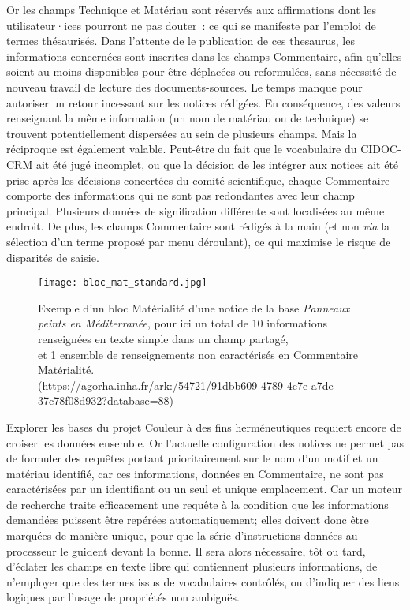 \documentclass[a4paper,12pt, twoside]{book}
\begin{document}
Or les champs \textsf{Technique} et \textsf{Matériau} sont réservés aux affirmations dont les utilisateur·ices pourront ne pas douter~: ce qui se manifeste par l’emploi de termes thésaurisés. Dans l’attente de le publication de ces thesaurus, les informations concernées sont inscrites dans les champs \textsf{Commentaire}, afin qu’elles soient au moins disponibles pour être déplacées ou reformulées, sans nécessité de nouveau travail de lecture des documents-sources. Le temps manque pour autoriser un retour incessant sur les notices rédigées. En conséquence, des valeurs renseignant la même information (un nom de matériau ou de technique) se trouvent potentiellement dispersées au sein de plusieurs champs. Mais la réciproque est également valable. Peut-être du fait que le vocabulaire du CIDOC-CRM ait été jugé incomplet, ou que la décision de les intégrer aux notices ait été prise après les décisions concertées du comité scientifique, chaque \textsf{Commentaire} comporte des informations qui ne sont pas redondantes avec leur champ principal. Plusieurs données de signification différente sont localisées au même endroit. De plus, les champs \textsf{Commentaire} sont rédigés à la main (et non \textit{via} la sélection d’un terme proposé par menu déroulant), ce qui maximise le risque de disparités de saisie.

\begin{figure}[ht]
    \centering
    \texttt{[image: bloc\_mat\_standard.jpg]}
    \caption*{Exemple d’un bloc \textsf{Matérialité} d’une notice de la base \textit{Panneaux peints en Méditerranée}, pour ici un total de 10 informations renseignées en texte simple dans un champ partagé,\\
    et 1 ensemble de renseignements non caractérisés en \textsf{Commentaire Matérialité}.\\
    (\url{https://agorha.inha.fr/ark:/54721/91dbb609-4789-4c7e-a7de-37c78f08d932?database=88})}
    \label{Un Bloc Matérialité normal.}
\end{figure}

Explorer les bases du projet Couleur à des fins herméneutiques requiert encore de croiser les données ensemble. Or l’actuelle configuration des notices ne permet pas de formuler des requêtes portant prioritairement sur le nom d’un motif et un matériau identifié, car ces informations, données en \textsf{Commentaire}, ne sont pas caractérisées par un identifiant ou un seul et unique emplacement. Car un moteur de recherche traite efficacement une requête à la condition que les informations demandées puissent être repérées automatiquement; elles doivent donc être marquées de manière unique, pour que la série d’instructions données au processeur le guident devant la bonne. Il sera alors nécessaire, tôt ou tard, d’éclater les champs en texte libre qui contiennent plusieurs informations, de n’employer que des termes issus de vocabulaires contrôlés, ou d’indiquer des liens logiques par l’usage de propriétés non ambiguës.
\end{document}
